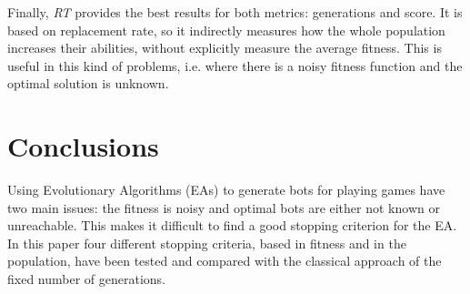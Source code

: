 \documentclass[runningheads,a4paper]{llncs}
\begin{document}
Finally, \textit{RT} provides the best results for both metrics: generations and score. It is based on replacement rate, so it indirectly measures how the whole population increases their abilities, without explicitly measure the average fitness. This is useful in this kind of problems, i.e. where there is a noisy fitness function and the optimal solution is unknown.



%
\section{Conclusions}




Using Evolutionary Algorithms (EAs) to generate bots for playing games have two main issues: the fitness is noisy and optimal bots are either not known or unreachable. This makes it difficult to find a good stopping criterion for the EA. In this paper four different stopping criteria, based in fitness and in the population, have been tested and compared with the classical approach of the fixed number of generations. 
\end{document}
